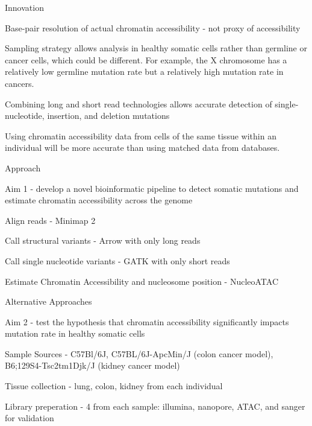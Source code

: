 \begin{outline}
\begin{outline}
\begin{outline}
		\end{outline}
	\end{outline}
	\item Innovation
	\begin{outline}
		\item Base-pair resolution of actual chromatin accessibility - not proxy of accessibility
		\item Sampling strategy allows analysis in healthy somatic cells rather than germline or cancer cells, which could be different. For example, the X chromosome has a relatively low germline mutation rate but a relatively high mutation rate in cancers. \parencite{makova_effects_2015}
		\item Combining long and short read technologies allows accurate detection of single-nucleotide, insertion, and deletion mutations
		\item Using chromatin accessibility data from cells of the same tissue within an individual will be more accurate than using matched data from databases.
	\end{outline}
	\item Approach
	\begin{outline}
		\item Aim 1 - develop a novel bioinformatic pipeline to detect somatic mutations and estimate chromatin accessibility across the genome
			\begin{outline}
				\item Align reads - Minimap 2
				\item Call structural variants - Arrow with only long reads
				\item Call single nucleotide variants - GATK with only short reads
				\item Estimate Chromatin Accessibility and nucleosome position - NucleoATAC \parencite{schep_structured_2015} 
				\item Alternative Approaches
			\end{outline}
		\item Aim 2 - test the hypothesis that chromatin accessibility significantly impacts mutation rate in healthy somatic cells
			\begin{outline}
				\item Sample Sources - C57Bl/6J, C57BL/6J-ApcMin/J (colon cancer model), B6;129S4-Tsc2tm1Djk/J (kidney cancer model)
				\item Tissue collection - lung, colon, kidney from each individual
				\item Library preperation - 4 from each sample: illumina, nanopore, ATAC, and sanger for validation

\end{outline}
\end{outline}
\end{outline}
